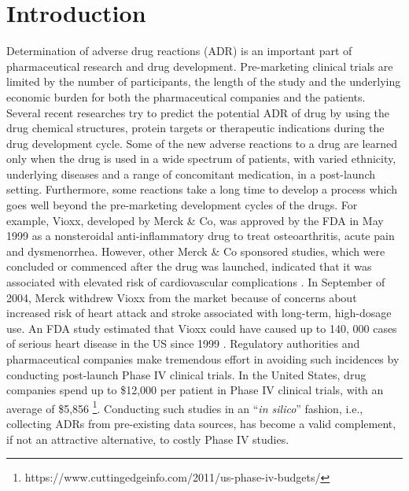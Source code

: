 \section{Introduction}
\label{intro}
Determination of adverse drug reactions (ADR) is an important part of pharmaceutical research and drug development. Pre-marketing clinical trials are limited by the number of participants, the length of the study and the underlying economic burden for both the pharmaceutical companies and the patients. Several recent researches try to predict the potential ADR of drug by using the drug chemical structures, protein targets or therapeutic indications during the drug development cycle\citep{scheiber2009mapping, xie2009drug, yamanishi2012drug, wang2014exploring, xiao2017adverse}. Some of the new adverse reactions to a drug are learned only when the drug is used in a wide spectrum of patients, with varied ethnicity, underlying diseases and a range of concomitant medication, in a post-launch setting. Furthermore, some reactions take a long time to develop a process which goes well beyond the pre-marketing development cycles of the drugs. For example, Vioxx, developed by Merck \& Co, was approved by the FDA in May 1999 as a nonsteroidal anti-inflammatory drug to treat osteoarthritis, acute pain and dysmenorrhea. However, other Merck \& Co sponsored studies, which were concluded or commenced after the drug was launched, indicated that it was associated with elevated risk of cardiovascular complications \citep{bombardier2000comparison,bresalier2005cardiovascular}. In September of 2004, Merck withdrew Vioxx from the market because of concerns about increased risk of heart attack and stroke associated with long-term, high-dosage use. An FDA study estimated that Vioxx could have caused up to 140, 000 cases of serious heart disease in the US since 1999 \citep{graham2005risk}.  Regulatory authorities and pharmaceutical companies make tremendous effort in avoiding such incidences by conducting post-launch Phase IV clinical trials. In the United States, drug companies spend up to \$12,000 per patient in Phase IV clinical trials, with an average of \$5,856 \footnote{https://www.cuttingedgeinfo.com/2011/us-phase-iv-budgets/}. Conducting such studies in an ``\textit{in silico}'' fashion, i.e., collecting ADRs from pre-existing data sources, has become a valid complement, if not an attractive alternative, to costly Phase IV studies.

